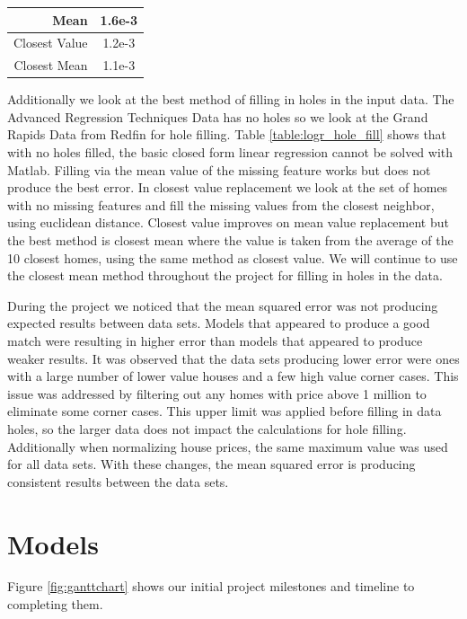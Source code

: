 \documentclass[10pt]{article}
\begin{document}
\begin{multicols}{2}
{\begin{tabular}{r|c}
				\hline
				\small{Mean} & \small{1.6e-3} \\
				\hline
				\small{Closest Value} & \small{1.2e-3} \\
				\hline
				\small{Closest Mean} & \small{1.1e-3} \\
				\hline
			\end{tabular}
			\label{table:linr_hole_fill}        
		\setlength{\parindent}{15pt} }
                \par
                Additionally we look at the best method of filling in holes in the input data. The Advanced Regression Techniques Data has no holes so we look at the Grand Rapids Data from Redfin for hole filling. Table \ref{table:logr_hole_fill} shows that with no holes filled, the basic closed form linear regression cannot be solved with Matlab. Filling via the mean value of the missing feature works but does not produce the best error.  In closest value replacement we look at the set of homes with no missing features and fill the missing values from the closest neighbor, using euclidean distance. Closest value improves on mean value replacement but the best method is closest mean where the value is taken from the average of the 10 closest homes, using the same method as closest value. We will continue to use the closest mean method throughout the project for filling in holes in the data.
                \par
                During the project we noticed that the mean squared error was not producing expected results between data sets. Models that appeared to produce a good match were resulting in higher error than models that appeared to produce weaker results. It was observed that the data sets producing lower error were ones with a large number of lower value houses and a few high value corner cases. This issue was addressed by filtering out any homes with price above 1 million to eliminate some corner cases. This upper limit was applied before filling in data holes, so the larger data does not impact the calculations for hole filling. Additionally when normalizing house prices, the same maximum value was used for all data sets. With these changes, the mean squared error is producing consistent results between the data sets.
 		\section{Models}
		Figure \ref{fig:ganttchart} shows our initial project milestones and timeline to completing them.
	\end{multicols}
\end{document}

